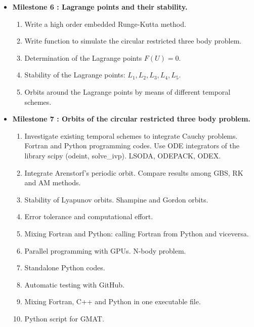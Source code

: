 \documentclass[12pt, a4paper]{article}
\begin{document}
\begin{itemize}

\item {\bf Milestone 6 : Lagrange points and their stability. }                                                      




\begin{enumerate}
\item Write a high order embedded Runge-Kutta method. 
\item Write function to simulate  the  circular restricted three body 
problem.
\item Determination of the Lagrange points $ F(U) = 0$. 
\item Stability of the Lagrange points: $ L_1, L_2 ,L_3,  L_4, L_5 $.
\item Orbits around the Lagrange points by means of different temporal schemes.

 \end{enumerate}
 
 

\item {\bf Milestone 7 : Orbits of the circular restricted three body 
    problem.}    

 \begin{enumerate} 
    
     \item Investigate existing temporal schemes to integrate Cauchy problems. 
     Fortran and Python programming codes.  
     Use ODE integrators of the library scipy (odeint, solve\_ivp). 
     LSODA, ODEPACK, ODEX.  
     \item Integrate Arenstorf's periodic orbit. Compare results among GBS, RK and 
     AM methods.  
     \item Stability of Lyapunov orbits.  Shampine and Gordon orbits.
     \item Error tolerance and computational effort. 
     \item Mixing Fortran and Python: calling Fortran from Python and viceversa.
     \item Parallel programming with GPUs. N-body problem. 
     \item Standalone Python codes.  
     \item Automatic testing with GitHub.
     \item Mixing Fortran, C++ and Python in one executable file.
     \item Python script for GMAT. 
 \end{enumerate}






 
 
\end{itemize}
\end{document}
